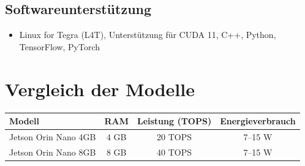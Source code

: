 \documentclass{article}
\begin{document}
\subsection{Softwareunterstützung}
\begin{itemize}
    \item Linux for Tegra (L4T), Unterstützung für CUDA 11, C++, Python, TensorFlow, PyTorch
\end{itemize}

\section{Vergleich der Modelle}

\begin{longtable}{|l|c|c|c|}
    \hline
    \textbf{Modell} & \textbf{RAM} & \textbf{Leistung (TOPS)} & \textbf{Energieverbrauch} \\
    \hline
    Jetson Orin Nano 4GB & 4 GB & 20 TOPS & 7–15 W \\
    Jetson Orin Nano 8GB & 8 GB & 40 TOPS & 7–15 W \\
    \hline
\end{longtable}
\end{document}
